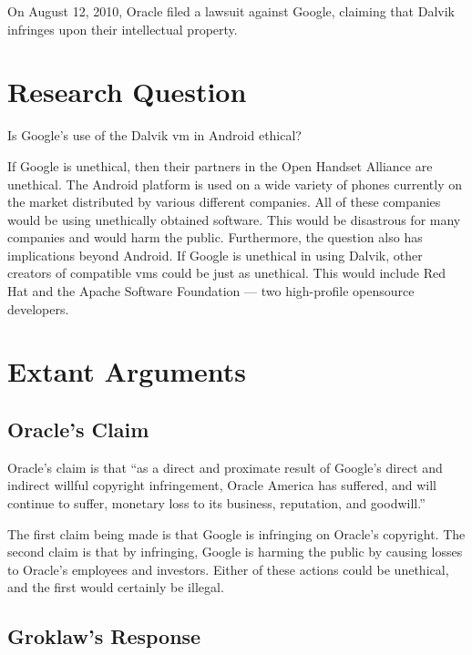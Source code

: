 \documentclass[11pt]{article}
\begin{document}
\begin{multicols}{2}
On August 12, 2010, Oracle filed a lawsuit against Google, claiming that Dalvik
infringes upon their intellectual property. \cite[Count VIII]{oracle-lawsuit}


\section{Research Question} %
\label{sec:question}

Is Google's use of the Dalvik \gls{vm} in Android ethical?

If Google is unethical, then their partners in the Open Handset Alliance are
unethical.  The Android platform is used on a wide variety of phones currently
on the market distributed by various different companies.  All of these
companies would be using unethically obtained software.  This would be
disastrous for many companies and would harm the public.  Furthermore, the
question also has implications beyond Android.  If Google is unethical in using
Dalvik, other creators of compatible \glspl{vm} could be just as unethical.
This would include Red Hat and the Apache Software Foundation --- two
high-profile \gls{opensource} developers.


\section{Extant Arguments} %
\label{sec:args}

\subsection{Oracle's Claim} %
\label{sub:args_oracle}

Oracle's claim is that ``as a direct and proximate result of Google's direct
and indirect willful copyright infringement, Oracle America has suffered, and
will continue to suffer, monetary loss to its business, reputation, and
goodwill.'' \cite[p.~9 line 11]{oracle-lawsuit}

The first claim being made is that Google is infringing on Oracle's copyright.
The second claim is that by infringing, Google is harming the public by causing
losses to Oracle's employees and investors.  Either of these actions could be
unethical, and the first would certainly be illegal.


\subsection{Groklaw's Response} %
\label{sub:args_groklaw}


\end{multicols}
\end{document}

